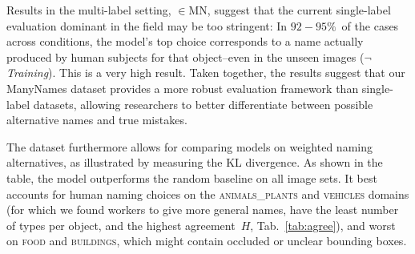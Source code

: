 Results in the multi-label setting, $\in$MN, suggest that the current single-label evaluation dominant in the field may be too stringent: In \mbox{$92-95\%$}\ of the cases across conditions, the model's top choice corresponds to a name actually produced by human subjects for that object--even in the unseen images (\mbox{$\neg$\textit{Training}}).
This is a very high result.
Taken together, the results suggest that our ManyNames dataset provides a more robust evaluation framework than single-label datasets, allowing researchers to better differentiate between possible alternative names and true mistakes.

The dataset furthermore allows for comparing models on weighted naming alternatives, as illustrated by measuring the KL divergence. 
As shown in the table, the model outperforms the random baseline on all image sets. 
It best accounts for human naming choices on the \textsc{animals\_plants} and \textsc{vehicles} domains (for which we found workers to give more general names, have the least number of types per object, and the highest agreement\ $H$, Tab.\ \ref{tab:agree}), and worst on \textsc{food} and \textsc{buildings}, which might  contain occluded or unclear bounding boxes.%

